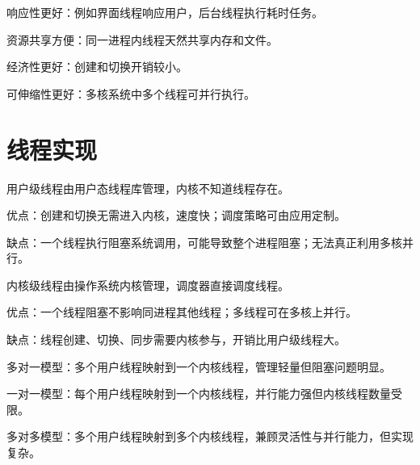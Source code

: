 \begin{points}
  \item 响应性更好：例如界面线程响应用户，后台线程执行耗时任务。
  \item 资源共享方便：同一进程内线程天然共享内存和文件。
  \item 经济性更好：创建和切换开销较小。
  \item 可伸缩性更好：多核系统中多个线程可并行执行。
\end{points}


\section{线程实现}
\begin{points}
  \item 用户级线程由用户态线程库管理，内核不知道线程存在。
  \item 优点：创建和切换无需进入内核，速度快；调度策略可由应用定制。
  \item 缺点：一个线程执行阻塞系统调用，可能导致整个进程阻塞；无法真正利用多核并行。
\end{points}


\begin{points}
  \item 内核级线程由操作系统内核管理，调度器直接调度线程。
  \item 优点：一个线程阻塞不影响同进程其他线程；多线程可在多核上并行。
  \item 缺点：线程创建、切换、同步需要内核参与，开销比用户级线程大。
\end{points}


\begin{points}
  \item 多对一模型：多个用户线程映射到一个内核线程，管理轻量但阻塞问题明显。
  \item 一对一模型：每个用户线程映射到一个内核线程，并行能力强但内核线程数量受限。
  \item 多对多模型：多个用户线程映射到多个内核线程，兼顾灵活性与并行能力，但实现复杂。
\end{points}


